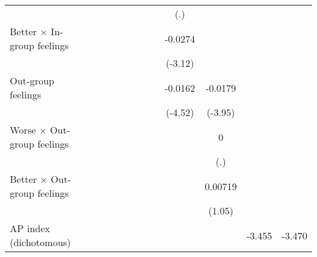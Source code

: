 {\begin{tabular}{l*{11}{c}}
                &                  &                  &                  &                  &                  &                  &                  &      (.)         &                  &                  &                  \\
Better $\times$ In-group feelings&                  &                  &                  &                  &                  &                  &                  &  -0.0274\sym{**} &                  &                  &                  \\
                &                  &                  &                  &                  &                  &                  &                  &  (-3.12)         &                  &                  &                  \\
Out-group feelings&                  &                  &                  &                  &                  &                  &                  &  -0.0162\sym{***}&  -0.0179\sym{***}&                  &                  \\
                &                  &                  &                  &                  &                  &                  &                  &  (-4.52)         &  (-3.95)         &                  &                  \\
Worse $\times$ Out-group feelings&                  &                  &                  &                  &                  &                  &                  &                  &        0         &                  &                  \\
                &                  &                  &                  &                  &                  &                  &                  &                  &      (.)         &                  &                  \\
Better $\times$ Out-group feelings&                  &                  &                  &                  &                  &                  &                  &                  &  0.00719         &                  &                  \\
                &                  &                  &                  &                  &                  &                  &                  &                  &   (1.05)         &                  &                  \\
AP index (dichotomous)&                  &                  &                  &                  &                  &                  &                  &                  &                  &   -3.455\sym{***}&   -3.470\sym{***}\\

\end{tabular}}
